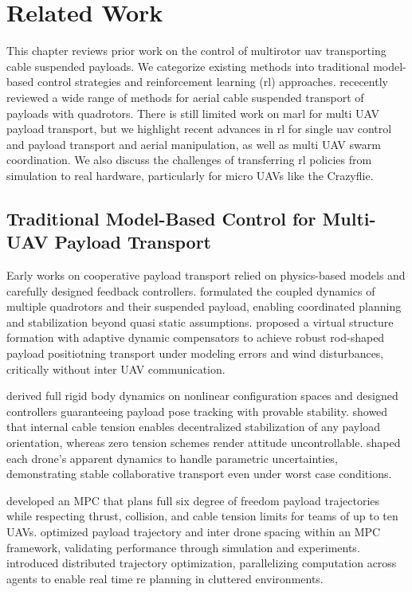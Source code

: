 

\chapter{Related Work}
This chapter reviews prior work on the control of multirotor \gls{uav} transporting cable suspended payloads. We categorize existing methods into traditional model-based control strategies and reinforcement learning (\gls{rl}) approaches. \cite{estevez_review_2024} rececently reviewed a wide range of methods for aerial cable suspended transport of payloads with quadrotors. There is still limited work on \gls{marl} for multi UAV payload transport, but we highlight recent advances in \gls{rl} for single \gls{uav} control and payload transport and aerial manipulation, as well as multi UAV swarm coordination. We also discuss the challenges of transferring \gls{rl} policies from simulation to real hardware, particularly for micro UAVs like the Crazyflie.

\section{Traditional Model-Based Control for Multi-UAV Payload Transport}
Early works on cooperative payload transport relied on physics-based models and carefully designed feedback controllers. \cite{sreenath_dynamics_2013} formulated the coupled dynamics of multiple quadrotors and their suspended payload, enabling coordinated planning and stabilization beyond quasi static assumptions. \cite{villa_cooperative_2021} proposed a virtual structure formation with adaptive dynamic compensators to achieve robust rod-shaped payload positiotning transport under modeling errors and wind disturbances, critically without inter UAV communication.

\cite{lee_geometric_2018} derived full rigid body dynamics on nonlinear configuration spaces and designed controllers guaranteeing payload pose tracking with provable stability. \cite{tognon_aerial_2018} showed that internal cable tension enables decentralized stabilization of any payload orientation, whereas zero tension schemes render attitude uncontrollable. \cite{tagliabue_robust_2017} shaped each drone’s apparent dynamics to handle parametric uncertainties, demonstrating stable collaborative transport even under worst case conditions.

\cite{sun_nonlinear_2023} developed an MPC that plans full six degree of freedom payload trajectories while respecting thrust, collision, and cable tension limits for teams of up to ten UAVs. \cite{li_nonlinear_2023} optimized payload trajectory and inter drone spacing within an MPC framework, validating performance through simulation and experiments. \cite{jackson_scalable_2020} introduced distributed trajectory optimization, parallelizing computation across agents to enable real time re planning in cluttered environments.


